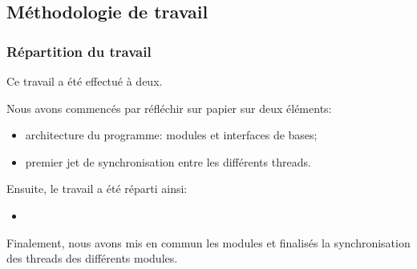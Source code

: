 \documentclass[11pt, a4paper]{article}
\begin{document}
\newpage

\subsection{Méthodologie de travail}
\subsubsection{Répartition du travail}

Ce travail a été effectué à deux.

Nous avons commencés par réfléchir sur papier sur deux éléments:

\begin{itemize}
    \item architecture du programme: modules et interfaces de bases;
    \item premier jet de synchronisation entre les différents threads. \\
\end{itemize}

Ensuite, le travail a été réparti ainsi:
\begin{itemize}
    \item
\end{itemize}

Finalement, nous avons mis en commun les modules et finalisés la synchronisation des threads des différents modules.

\newpage
\end{document}
